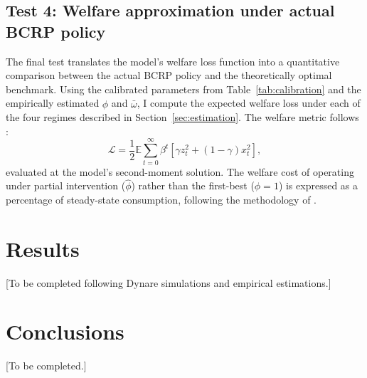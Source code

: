 \documentclass[12pt,a4paper]{article}
\begin{document}
\subsection{Test 4: Welfare approximation under actual BCRP policy}

The final test translates the model's welfare loss function into a quantitative comparison between the actual BCRP policy and the theoretically optimal benchmark. Using the calibrated parameters from Table~\ref{tab:calibration} and the empirically estimated $\hat{\phi}$ and $\bar{\omega}$, I compute the expected welfare loss under each of the four regimes described in Section~\ref{sec:estimation}. The welfare metric follows \cite{itskhokimukhin2025}:
\begin{equation}
    \mathcal{L} = \frac{1}{2} \mathbb{E} \sum_{t=0}^{\infty} \beta^t \left[\gamma z_t^2 + (1-\gamma) x_t^2\right],
\end{equation}
evaluated at the model's second-moment solution. The welfare cost of operating under partial intervention ($\hat{\phi}$) rather than the first-best ($\phi = 1$) is expressed as a percentage of steady-state consumption, following the methodology of \cite{MONTORO2023102825}. 

\section{Results}
\label{sec:results}

[To be completed following Dynare simulations and empirical estimations.]

\section{Conclusions}

[To be completed.]


\end{document}
